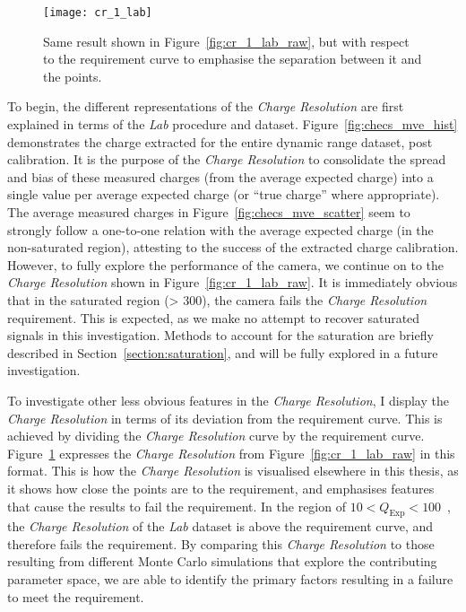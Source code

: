 \begin{figure}
	\centering
    \texttt{[image: cr\_1\_lab]} 
	\caption[\textit{Charge Resolution} of the Lab dataset with respect to the requirement.]{Same result shown in Figure~\ref{fig:cr_1_lab_raw}, but with respect to the requirement curve to emphasise the separation between it and the points.}
	\label{fig:cr_1_lab}
\end{figure}

To begin, the different representations of the \textit{Charge Resolution} are first explained in terms of the \textit{Lab} procedure and dataset. Figure~\ref{fig:checs_mve_hist} demonstrates the charge extracted for the entire dynamic range dataset, post calibration. It is the purpose of the \textit{Charge Resolution} to consolidate the spread and bias of these measured charges (from the average expected charge) into a single value per average expected charge (or ``true charge'' where appropriate). The average measured charges in Figure~\ref{fig:checs_mve_scatter} seem to strongly follow a one-to-one relation with the average expected charge (in the non-saturated region), attesting to the success of the extracted charge calibration. However, to fully explore the performance of the camera, we continue on to the \textit{Charge Resolution} shown in Figure~\ref{fig:cr_1_lab_raw}. It is immediately obvious that in the saturated region (\SI{> 300}{\pe}), the camera fails the \textit{Charge Resolution} requirement. This is expected, as we make no attempt to recover saturated signals in this investigation. Methods to account for the saturation are briefly described in Section~\ref{section:saturation}, and will be fully explored in a future investigation. 

To investigate other less obvious features in the \textit{Charge Resolution}, I display the \textit{Charge Resolution} in terms of its deviation from the requirement curve. This is achieved by dividing the \textit{Charge Resolution} curve by the requirement curve. Figure~\ref{fig:cr_1_lab} expresses the \textit{Charge Resolution} from Figure~\ref{fig:cr_1_lab_raw} in this format. This is how the \textit{Charge Resolution} is visualised elsewhere in this thesis, as it shows how close the points are to the requirement, and emphasises features that cause the results to fail the requirement. In the region of $10 < Q_\text{Exp} < 100$~\si{\pe}, the \textit{Charge Resolution} of the \textit{Lab} dataset is above the requirement curve, and therefore fails the requirement. By comparing this \textit{Charge Resolution} to those resulting from different Monte Carlo simulations that explore the contributing parameter space, we are able to identify the primary factors resulting in a failure to meet the requirement.

